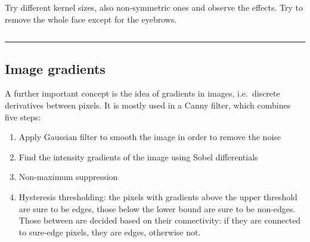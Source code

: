 \documentclass[11pt,a4paper, d]{scrartcl}
\makeatletter
\providecommand{\tightlist}{%
      \setlength{\itemsep}{0pt}\setlength{\parskip}{0pt}}
\newcommand{\boxspacing}{\kern\kvtcb@left@rule\kern\kvtcb@boxsep}
\newcommand{\prompt}[4]{
        {\ttfamily\llap{{\color{#2}[#3]:\hspace{3pt}#4}}\vspace{-\baselineskip}}
    }
\makeatother
\begin{document}
Try different kernel sizes, also non-symmetric ones and observe the
effects. Try to remove the whole face except for the eyebrows.

    \begin{tcolorbox}[breakable, size=fbox, boxrule=1pt, pad at break*=1mm,colback=cellbackground, colframe=cellborder]
\prompt{In}{incolor}{ }{\boxspacing}
\begin{Verbatim}[commandchars=\\\{\}]

\end{Verbatim}
\end{tcolorbox}

    \begin{center}\rule{0.5\linewidth}{0.5pt}\end{center}

\hypertarget{image-gradients}{%
\subsection{Image gradients}\label{image-gradients}}

A further important concept is the idea of gradients in images,
i.e.~discrete derivatives between pixels. It is mostly used in a Canny
filter, which combines five steps:

\begin{enumerate}
\def\labelenumi{\arabic{enumi}.}
\tightlist
\item
  Apply Gaussian filter to smooth the image in order to remove the noise
\item
  Find the intensity gradients of the image using Sobel differentials
\item
  Non-maximum suppression
\item
  Hysteresis thresholding: the pixels with gradients above the upper
  threshold are sure to be edges, those below the lower bound are sure
  to be non-edges. Those between are decided based on their
  connectivity: if they are connected to sure-edge pixels, they are
  edges, otherwise not.
\end{enumerate}
\end{document}
